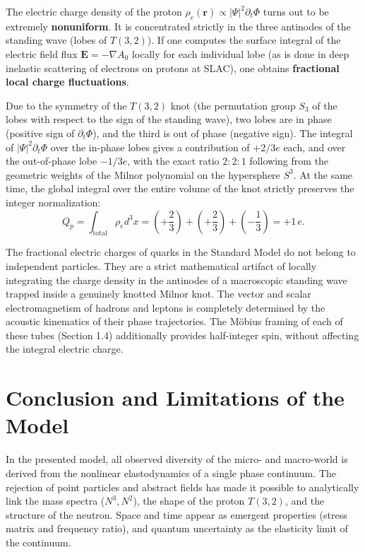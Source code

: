 \documentclass[11pt,a4paper]{article}
\begin{document}
The electric charge density of the proton $\rho_e(\mathbf{r}) \propto |\Psi|^2 \partial_t \Phi$ turns out to be extremely \textbf{nonuniform}. It is concentrated strictly in the three antinodes of the standing wave (lobes of $T(3,2)$).
If one computes the surface integral of the electric field flux $\mathbf{E} = -\nabla A_0$ locally for each individual lobe (as is done in deep inelastic scattering of electrons on protons at SLAC), one obtains \textbf{fractional local charge fluctuations}.

Due to the symmetry of the $T(3,2)$ knot (the permutation group $S_3$ of the lobes with respect to the sign of the standing wave), two lobes are in phase (positive sign of $\partial_t \Phi$), and the third is out of phase (negative sign). The integral of $|\Psi|^2 \partial_t \Phi$ over the in-phase lobes gives a contribution of $+2/3 e$ each, and over the out-of-phase lobe $-1/3 e$, with the exact ratio $2:2:1$ following from the geometric weights of the Milnor polynomial on the hypersphere $S^3$. At the same time, the global integral over the entire volume of the knot strictly preserves the integer normalization:
\begin{equation}
Q_p = \int_{\text{total}} \rho_e d^3x = \left(+\frac{2}{3}\right) + \left(+\frac{2}{3}\right) + \left(-\frac{1}{3}\right) = +1\,e.
\end{equation}

The fractional electric charges of quarks in the Standard Model do not belong to independent particles. They are a strict mathematical artifact of locally integrating the charge density in the antinodes of a macroscopic standing wave trapped inside a genuinely knotted Milnor knot. The vector and scalar electromagnetism of hadrons and leptons is completely determined by the acoustic kinematics of their phase trajectories. The Möbius framing of each of these tubes (Section 1.4) additionally provides half-integer spin, without affecting the integral electric charge.

\section*{Conclusion and Limitations of the Model}

In the presented model, all observed diversity of the micro- and macro-world is derived from the nonlinear elastodynamics of a single phase continuum. The rejection of point particles and abstract fields has made it possible to analytically link the mass spectra ($N^3, N^2$), the shape of the proton $T(3,2)$, and the structure of the neutron. Space and time appear as emergent properties (stress matrix and frequency ratio), and quantum uncertainty as the elasticity limit of the continuum.
\end{document}
